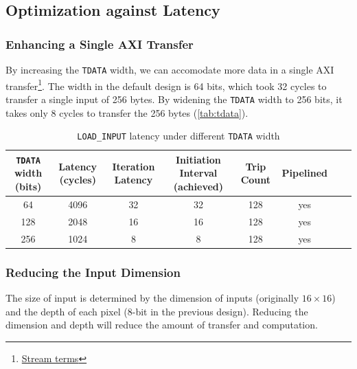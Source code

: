 \subsection{Optimization against Latency}

\subsubsection{Enhancing a Single AXI Transfer}

By increasing the \texttt{TDATA} width, we can accomodate more data in a single AXI transfer\footnote{
    \href{https://developer.arm.com/documentation/ihi0051/a/Introduction/About-the-AXI4-Stream-protocol/Stream-terms}{Stream terms}
}.
The width in the default design is 64 bits, which took 32 cycles to transfer a single input of 256 bytes.
By widening the \texttt{TDATA} width to 256 bits, it takes only 8 cycles to transfer the 256 bytes (\autoref{tab:tdata}).

\begin{table}[ht!]
    \centering
    \caption{\texttt{LOAD\_INPUT} latency under different \texttt{TDATA} width}
    \label{tab:tdata}
    \begin{tabular}{cccccccc}
        \toprule
        \texttt{TDATA} width (bits) & Latency (cycles) & Iteration Latency & Initiation Interval (achieved) & Trip Count & Pipelined \\
        \midrule
        64                          & 4096             & 32                & 32                             & 128        & yes       \\
        128                         & 2048             & 16                & 16                             & 128        & yes       \\
        256                         & 1024             & 8                 & 8                              & 128        & yes       \\
        \bottomrule
    \end{tabular}
\end{table}

\subsubsection{Reducing the Input Dimension}

The size of input is determined by the dimension of inputs (originally \(16 \times 16\)) and the depth of each pixel (8-bit in the previous design).
Reducing the dimension and depth will reduce the amount of transfer and computation.

